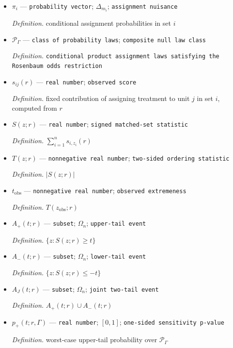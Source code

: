 \documentclass{article}
\begin{document}
\begin{itemize}
  \item \(\pi_i\) --- \texttt{probability vector}; \(\Delta_{m_i}\); \texttt{assignment nuisance}
  \par\smallskip\noindent\emph{Definition.} conditional assignment probabilities in set \(i\)
  \item \(\mathcal P_\Gamma\) --- \texttt{class of probability laws}; \texttt{composite null law class}
  \par\smallskip\noindent\emph{Definition.} \texttt{conditional product assignment laws satisfying the Rosenbaum odds restriction}
  \item \(s_{ij}(r)\) --- \texttt{real number}; \texttt{observed score}
  \par\smallskip\noindent\emph{Definition.} fixed contribution of assigning treatment to unit \(j\) in set \(i\), computed from \(r\)
  \item \(S(z;r)\) --- \texttt{real number}; \texttt{signed matched-\allowbreak{}set statistic}
  \par\smallskip\noindent\emph{Definition.} \(\sum_{i=1}^n s_{i,z_i}(r)\)
  \item \(T(z;r)\) --- \texttt{nonnegative real number}; \texttt{two-\allowbreak{}sided ordering statistic}
  \par\smallskip\noindent\emph{Definition.} \(\lvert S(z;r)\rvert\)
  \item \(t_{\mathrm{obs}}\) --- \texttt{nonnegative real number}; \texttt{observed extremeness}
  \par\smallskip\noindent\emph{Definition.} \(T(z_{\mathrm{obs}};r)\)
  \item \(A_+(t;r)\) --- \texttt{subset}; \(\Omega_n\); \texttt{upper-\allowbreak{}tail event}
  \par\smallskip\noindent\emph{Definition.} \(\{z:S(z;r)\ge t\}\)
  \item \(A_-(t;r)\) --- \texttt{subset}; \(\Omega_n\); \texttt{lower-\allowbreak{}tail event}
  \par\smallskip\noindent\emph{Definition.} \(\{z:S(z;r)\le-t\}\)
  \item \(A_J(t;r)\) --- \texttt{subset}; \(\Omega_n\); \texttt{joint two-\allowbreak{}tail event}
  \par\smallskip\noindent\emph{Definition.} \(A_+(t;r)\cup A_-(t;r)\)
  \item \(p_+(t;r,\Gamma)\) --- \texttt{real number}; \([0,1]\); \texttt{one-\allowbreak{}sided sensitivity p-\allowbreak{}value}
  \par\smallskip\noindent\emph{Definition.} worst-case upper-tail probability over \(\mathcal P_\Gamma\)

\end{itemize}
\end{document}

